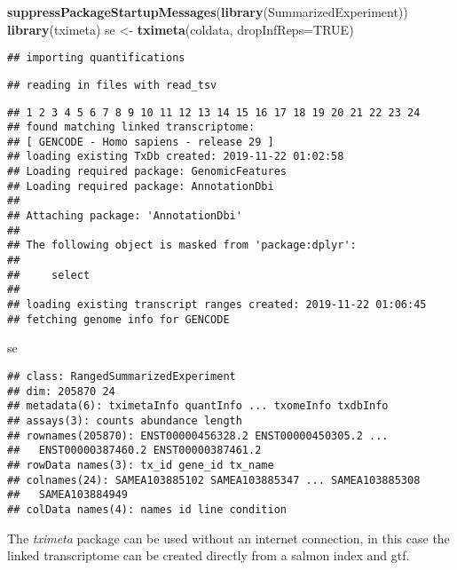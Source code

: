 \documentclass[
  9pt,
  a4paper,
]{extarticle}
\newenvironment{Shaded}{\begin{snugshade}}{\end{snugshade}}
\newcommand{\DataTypeTok}[1]{\textcolor[rgb]{0.13,0.29,0.53}{#1}}
\newcommand{\KeywordTok}[1]{\textcolor[rgb]{0.13,0.29,0.53}{\textbf{#1}}}
\newcommand{\NormalTok}[1]{#1}
\newcommand{\OtherTok}[1]{\textcolor[rgb]{0.56,0.35,0.01}{#1}}
\newcommand{\StringTok}[1]{\textcolor[rgb]{0.31,0.60,0.02}{#1}}
\begin{document}
\begin{Shaded}
\begin{Highlighting}[]
\KeywordTok{suppressPackageStartupMessages}\NormalTok{(}\KeywordTok{library}\NormalTok{(SummarizedExperiment))}
\KeywordTok{library}\NormalTok{(tximeta)}
\NormalTok{se <-}\StringTok{ }\KeywordTok{tximeta}\NormalTok{(coldata, }\DataTypeTok{dropInfReps=}\OtherTok{TRUE}\NormalTok{)}
\end{Highlighting}
\end{Shaded}

\begin{verbatim}
## importing quantifications
\end{verbatim}

\begin{verbatim}
## reading in files with read_tsv
\end{verbatim}

\begin{verbatim}
## 1 2 3 4 5 6 7 8 9 10 11 12 13 14 15 16 17 18 19 20 21 22 23 24 
## found matching linked transcriptome:
## [ GENCODE - Homo sapiens - release 29 ]
## loading existing TxDb created: 2019-11-22 01:02:58
## Loading required package: GenomicFeatures
## Loading required package: AnnotationDbi
## 
## Attaching package: 'AnnotationDbi'
## 
## The following object is masked from 'package:dplyr':
## 
##     select
## 
## loading existing transcript ranges created: 2019-11-22 01:06:45
## fetching genome info for GENCODE
\end{verbatim}

\begin{Shaded}
\begin{Highlighting}[]
\NormalTok{se}
\end{Highlighting}
\end{Shaded}

\begin{verbatim}
## class: RangedSummarizedExperiment 
## dim: 205870 24 
## metadata(6): tximetaInfo quantInfo ... txomeInfo txdbInfo
## assays(3): counts abundance length
## rownames(205870): ENST00000456328.2 ENST00000450305.2 ...
##   ENST00000387460.2 ENST00000387461.2
## rowData names(3): tx_id gene_id tx_name
## colnames(24): SAMEA103885102 SAMEA103885347 ... SAMEA103885308
##   SAMEA103884949
## colData names(4): names id line condition
\end{verbatim}

The \emph{tximeta} package can be used without an internet connection, in this
case the linked transcriptome can be created directly from a salmon
index and gtf.
\end{document}

